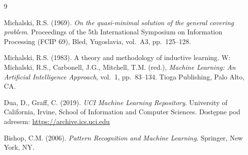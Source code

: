 \documentclass[12pt,a4paper]{article}
\begin{document}
\begin{thebibliography}{9}

Michalski, R.S. (1969).
\textit{On the quasi-minimal solution of the general covering problem}.
Proceedings of the 5th International Symposium on Information Processing (FCIP 69),
Bled, Yugoslavia, vol.\ A3, pp.\ 125--128.

Michalski, R.S. (1983).
A theory and methodology of inductive learning.
W: Michalski, R.S., Carbonell, J.G., Mitchell, T.M. (red.),
\textit{Machine Learning: An Artificial Intelligence Approach}, vol.\ 1,
pp.\ 83--134. Tioga Publishing, Palo Alto, CA.

Dua, D., Graff, C. (2019).
\textit{UCI Machine Learning Repository}.
University of California, Irvine, School of Information and Computer Sciences.
Dostępne pod adresem: \url{https://archive.ics.uci.edu}

Bishop, C.M. (2006).
\textit{Pattern Recognition and Machine Learning}.
Springer, New York, NY.

\end{thebibliography}
\end{document}
